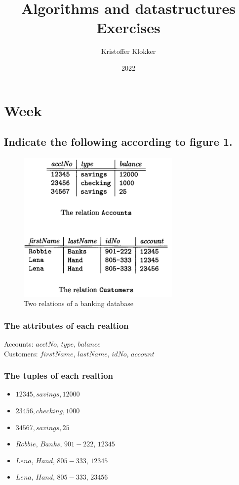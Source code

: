 \documentclass[12pt, a4paper]{article}
\title{Algorithms and datastructures\\Exercises}
\date{2022}
\author{Kristoffer Klokker}
\begin{document}
	\maketitle
	\clearpage
	\tableofcontents
	\clearpage
		\setcounter{section}{5}
		\section{Week}
			\subsection{Indicate the following according to figure 1.}
				\begin{figure}[h!]
					\centering
					\includegraphics[width=300px]{assets/W6E1.png}
					\caption{Two relations of a banking database}
				\end{figure}
				\subsubsection{The attributes of each realtion}
					Accounts: $acctNo$, $type$, $balance$\\
					Customers: $firstName$, $lastName$, $idNo$, $account$
				\subsubsection{The tuples of each realtion}
					\begin{itemize}
						\item $12345, savings, 12000$
						\item $23456, checking, 1000$
						\item $34567, savings, 25$\\[5mm]
						\item $Robbie$, $Banks$, $901-222$, $12345$
						\item $Lena$, $Hand$, $805-333$, $12345$
						\item $Lena$, $Hand$, $805-333$, $23456$ 
					\end{itemize}
\end{document}
